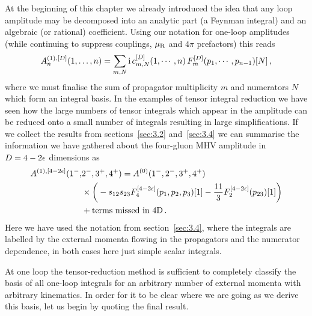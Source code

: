At the beginning of this chapter we already introduced the idea that any
loop amplitude may be decomposed into an analytic part (a Feynman integral) and
an algebraic (or rational) coefficient. Using our notation for one-loop amplitudes (while continuing to suppress couplings, $\mu_{\rm R}$ and $4\pi$ prefactors) this reads
\begin{align}
  A_n^{(1),[D]}(1,\ldots,n) =
  \sum_{m,N} \mathrm{i} \, c_{m,N}^{[D]} (1,\cdots,n) \, F_{m}^{[D]}(p_1,\cdots,p_{n-1})[N] \,,
  \label{eq:loopamp-general-repeat}
\end{align}
where we must finalise the sum of propagator multiplicity $m$ and numerators
$N$ which form an integral basis.  In the examples of tensor integral reduction
we have seen how the large numbers of tensor integrals which appear in the
amplitude can be reduced onto a small number of integrals resulting in large
simplifications. If we collect the results from sections~\ref{sec:3.2} and~\ref{sec:3.4} we can summarise the information we have gathered about the four-gluon MHV amplitude in $D=4-2\epsilon$ dimensions as
\begin{align}
  A^{(1),[4-2\epsilon]}(1^-,&2^-,3^+,4^+) = A^{(0)}(1^-,2^-,3^+,4^+) \nonumber\\&
     \times \bigg(-s_{12}s_{23} F^{[4-2\epsilon]}_4(p_{1},p_{2},p_{3})[1] - \frac{11}{3} F^{[4-2\epsilon]}_2(p_{23})[1] \bigg)
     \nonumber\\&
     + \text{terms missed in 4D} \,.
   \label{eq:4g1loop}
\end{align} 
Here we have used the notation from section~\ref{sec:3.4}, where the integrals
are labelled by the external momenta flowing in the propagators and the
numerator dependence, in both cases here just simple scalar integrals.

At one loop the tensor-reduction method is sufficient to completely classify the
basis of all one-loop integrals for an arbitrary number of external momenta
with arbitrary kinematics. In order for it to be clear where we are going as we
derive this basis, let us begin by quoting the final result.

